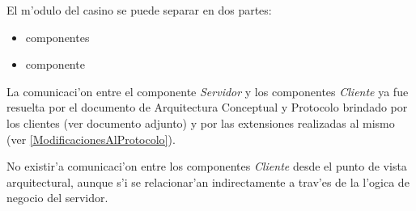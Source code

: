 El m'odulo del casino se puede separar en dos partes: 

\begin{itemize}
\item componentes 
\item componente 
\end{itemize}  

La comunicaci'on entre el componente {\it Servidor} y los componentes {\it Cliente} ya fue resuelta por el documento de Arquitectura Conceptual y Protocolo brindado por los clientes (ver documento adjunto) y por las extensiones realizadas al mismo (ver \ref{ModificacionesAlProtocolo}).

No existir'a comunicaci'on entre los componentes {\it Cliente} desde el punto de vista arquitectural, aunque s'i se relacionar'an indirectamente a trav'es de la l'ogica de negocio del servidor.
